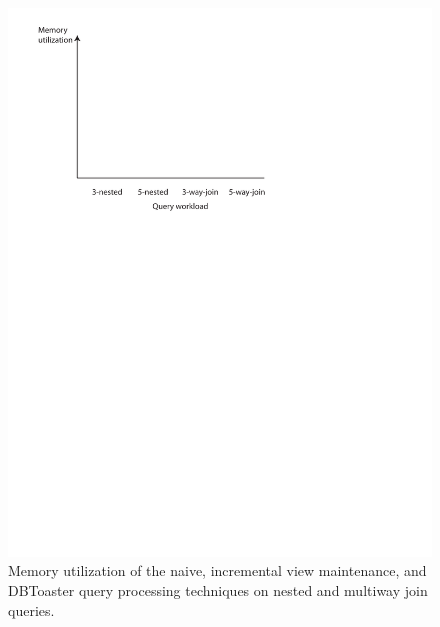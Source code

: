 \documentclass{sig-alternate}
\begin{document}
\begin{figure}
\includegraphics[scale=0.6]{figures/axes-memnjquery.pdf}
\caption{Memory utilization of the naive, incremental view maintenance, and
  DBToaster query processing techniques on nested and multiway join queries.}
\label{fig:memutil-njquery}
\end{figure}
\end{document}
